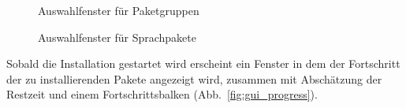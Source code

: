 \begin{figure}[ht!]
  \centering
  \caption{Auswahlfenster für Paketgruppen}
  \label{fig:gui_coll}
\end{figure}

\begin{figure}[ht!]
  \centering
  \caption{Auswahlfenster für Sprachpakete}
  \label{fig:gui_lang}
\end{figure}

Sobald die Installation gestartet wird erscheint ein Fenster in dem
der Fortschritt der zu installierenden Pakete angezeigt wird, zusammen mit
Abschätzung der Restzeit und einem Fortschrittsbalken
(Abb.~\ref{fig:gui_progress}).

